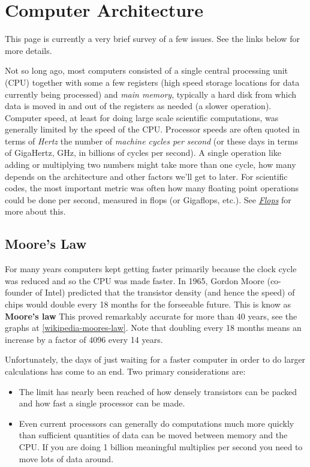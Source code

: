 \documentclass[letterpaper,10pt,english]{sphinxmanual}
\begin{document}
\section{Computer Architecture}
\label{computer_arch:computer-architecture}\label{computer_arch:computer-arch}\label{computer_arch::doc}
This page is currently a very brief survey of a few issues.  See the links
below for more details.

Not so long ago, most computers consisted of a single central processing unit
(CPU) together with some a few registers (high speed storage locations for
data currently being processed) and \emph{main memory}, typically a hard disk
from which data is moved in and out of the registers as needed (a slower
operation).  Computer speed, at least for doing large scale scientific
computations, was generally limited by the speed of the CPU.  Processor
speeds are often quoted in terms of \emph{Hertz} the number of \emph{machine cycles
per second} (or these days in terms of GigaHertz, GHz, in billions of cycles
per second).  A single operation like adding or multiplying two numbers
might take more than one cycle, how many depends on the architecture and
other factors we'll get to later.  For scientific codes, the most important
metric was often how many floating point operations could be done per
second, measured in flops (or Gigaflops, etc.).
See {\hyperref[metrics:flops]{\emph{Flops}}} for more about this.


\subsection{Moore's Law}
\label{computer_arch:moore-s-law}\label{computer_arch:moores-law}
For many years computers kept getting faster primarily because the clock
cycle was reduced and so the CPU was made faster.  In 1965, Gordon Moore
(co-founder of Intel) predicted that the transistor density (and hence the
speed) of chips would double every 18 months for the forseeable future.
This is know as \textbf{Moore's law}
This proved remarkably accurate for more than 40 years, see the graphs at
\href{http://en.wikipedia.org/wiki/Moore\%27s\_law}{{[}wikipedia-moores-law{]}}.
Note that doubling every 18 months means an increase by a factor of 4096
every 14 years.

Unfortunately, the days of just waiting for a faster computer in order to do
larger calculations has come to an end.  Two primary considerations are:
\begin{itemize}
\item {} 
The limit has nearly been reached of how densely transistors can be
packed and how fast a single processor can be made.

\item {} 
Even current processors can generally do computations much more quickly
than sufficient quantities of data can be moved between memory and
the CPU.  If you are doing 1 billion meaningful multiplies per second
you need to move lots of data around.

\end{itemize}
\end{document}
